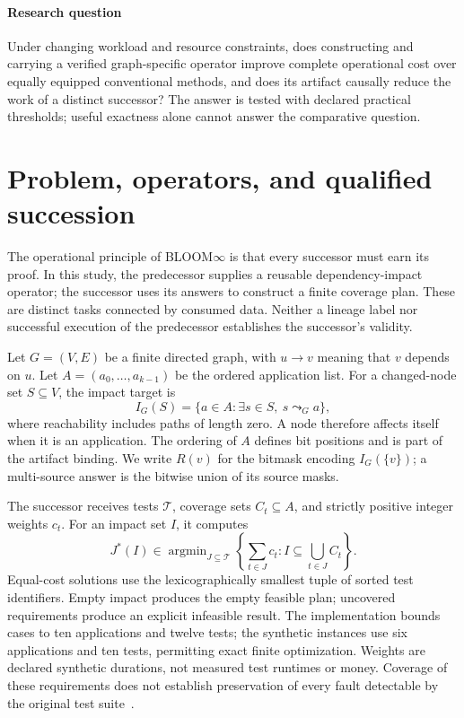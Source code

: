 \documentclass[11pt,letterpaper]{article}
\begin{document}
\paragraph{Research question} Under changing workload and resource constraints, does constructing and carrying a verified graph-specific operator improve complete operational cost over equally equipped conventional methods, and does its artifact causally reduce the work of a distinct successor? The answer is tested with declared practical thresholds; useful exactness alone cannot answer the comparative question.

\section{Problem, operators, and qualified succession}
\label{sec:bloom-formal}

The operational principle of \textsc{BLOOM}$\infty$ is that every successor must earn its proof. In this study, the predecessor supplies a reusable dependency-impact operator; the successor uses its answers to construct a finite coverage plan. These are distinct tasks connected by consumed data. Neither a lineage label nor successful execution of the predecessor establishes the successor's validity.

Let $G=(V,E)$ be a finite directed graph, with $u\to v$ meaning that $v$ depends on $u$. Let $A=(a_0,\ldots,a_{k-1})$ be the ordered application list. For a changed-node set $S\subseteq V$, the impact target is
\begin{equation}
 I_G(S)=\{a\in A:\exists s\in S,\ s\leadsto_G a\},
\end{equation}
where reachability includes paths of length zero. A node therefore affects itself when it is an application. The ordering of $A$ defines bit positions and is part of the artifact binding. We write $R(v)$ for the bitmask encoding $I_G(\{v\})$; a multi-source answer is the bitwise union of its source masks.

The successor receives tests $\mathcal{T}$, coverage sets $C_t\subseteq A$, and strictly positive integer weights $c_t$. For an impact set $I$, it computes
\begin{equation}
 J^*(I)\in\mathop{\arg\min}_{J\subseteq\mathcal{T}}
 \left\{\sum_{t\in J}c_t:I\subseteq\bigcup_{t\in J}C_t\right\}.
\end{equation}
Equal-cost solutions use the lexicographically smallest tuple of sorted test identifiers. Empty impact produces the empty feasible plan; uncovered requirements produce an explicit infeasible result. The implementation bounds cases to ten applications and twelve tests; the synthetic instances use six applications and ten tests, permitting exact finite optimization. Weights are declared synthetic durations, not measured test runtimes or money. Coverage of these requirements does not establish preservation of every fault detectable by the original test suite~\cite{rothermel1997safe,harrold1993reduction}.
\end{document}
